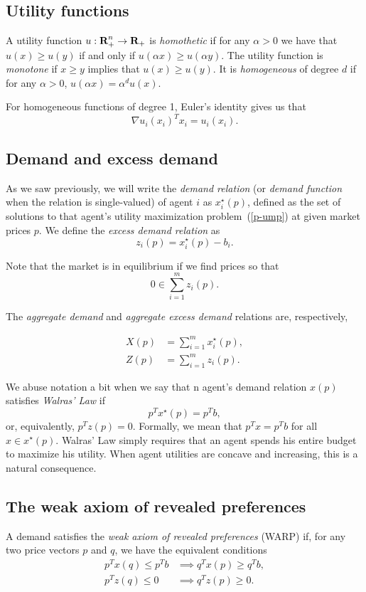 \documentclass[12pt]{article}
\begin{document}
\subsection{Utility functions}
A utility function $u: {\mbox{\bf R}}^n_+ \to {\mbox{\bf R}}_+$ is \emph{homothetic} if for any $\alpha > 0$ we have that $u(x) \geq u(y)$ if and only if
$u(\alpha x) \geq u(\alpha y)$.
The utility function is \emph{monotone} if $x \geq y$ implies that $u(x) \geq u(y)$.
It is \emph{homogeneous} of degree $d$ if for any $\alpha > 0$,
$u(\alpha x) = \alpha^d u(x)$.

For homogeneous functions of degree 1, Euler's identity gives us that
\[
\nabla u_i(x_i)^T x_i = u_i(x_i).
\]


\subsection{Demand and excess demand}
As we saw previously, we will write the \emph{demand relation}
(or \emph{demand function}
when the relation is single-valued) of agent $i$ as $x^\star_i(p)$,
defined as the set of solutions to that agent's
utility maximization problem~(\ref{p-ump}) at given market prices $p$.
We define the \emph{excess demand relation} as 
\[
z_i(p) = x^\star_i(p) - b_i.
\]

Note that the market is in equilibrium if we find prices so that
\[
0 \in \sum_{i=1}^m z_i(p).
\]

The \emph{aggregate demand} and \emph{aggregate excess demand} relations are,
respectively,

\begin{align*}
X(p) &= \sum_{i=1}^m x^\star_i(p),\\
Z(p) &= \sum_{i=1}^m z_i(p).
\end{align*}

We abuse notation a bit when we say that n agent's demand relation $x(p)$ satisfies \emph{Walras' Law} if
\[
p^T x^\star(p) = p^T b,
\]
or, equivalently, $p^T z(p) = 0$.
Formally, we mean that $p^T x = p^T b$ for all $x \in x^\star(p)$.
Walras' Law simply requires that an agent spends his entire budget to
maximize his utility. When agent utilities are concave and increasing,
this is a natural consequence.

\subsection{The weak axiom of revealed preferences}
A demand satisfies the \emph{weak axiom of revealed preferences}
(WARP) if, for any two price vectors $p$ and $q$, we have the equivalent
conditions
\begin{align*}
p^T x(q) \leq p^T b &\implies q^T x(p) \geq q^T b,\\
p^T z(q) \leq 0 &\implies q^T z(p) \geq 0.
\end{align*}
\end{document}
